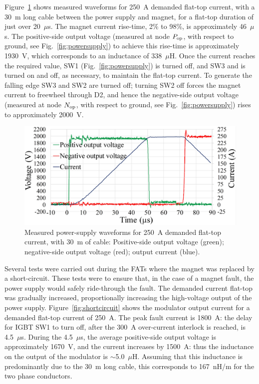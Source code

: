 \documentclass[aps,prab,twocolumn,superscriptaddress]{revtex4-1}
\begin{document}
Figure~\ref{fig:normaloperation} shows measured waveforms for 250~A demanded flat-top current, with a 30~m long cable between the power supply and magnet, for a flat-top duration of just over 20~$\mu$s. The magnet current rise-time, 2\% to 98\%, is approximately 46~$\mu$s. The positive-side output voltage (measured at node ${P_{\rm{op}}}$, with respect to ground, see Fig.~\ref{fig:powersupply}) to achieve this rise-time is approximately 1930~V, which corresponds to an inductance of 338~$\mu$H. Once the current reaches the required value, SW1 (Fig.~\ref{fig:powersupply}) is turned off, and SW3 and  is turned on and off, as necessary, to maintain the flat-top current. To generate the falling edge SW3 and SW2 are turned off; turning SW2 off forces the magnet current to freewheel through D2, and hence the negative-side output voltage (measured at node ${N_{\rm{op}}}$, with respect to ground, see Fig.~\ref{fig:powersupply}) rises to approximately 2000~V.

\begin{figure}[h]
	\includegraphics[width=\linewidth]{normal_operation-smaller.png} %
	\caption{Measured power-supply waveforms for 250~A demanded flat-top current, with 30~m of cable: Positive-side output voltage (green); negative-side output voltage (red); output current (blue).}
	\label{fig:normaloperation}
\end{figure}

Several tests were carried out during the FATs where the magnet was replaced by a short-circuit.  These tests were to ensure that, in the case of a magnet fault, the power supply would safely ride-through the fault. The demanded current flat-top was gradually increased, proportionally increasing the high-voltage output of the power supply. Figure~\ref{fig:shortcircuit} shows the modulator output current for a demanded flat-top current of 250~A. The peak fault current is 1800~A: the delay for IGBT SW1 to turn off, after the 300~A over-current interlock is reached, is 4.5~$\mu$s. During the 4.5~$\mu$s, the average positive-side output voltage is approximately 1670~V, and the current increases by 1500~A: thus the inductance on the output of the modulator is $\sim$5.0~$\mu$H. Assuming that this inductance is predominantly due to the 30~m long cable, this corresponds to 167~nH/m for the two phase conductors.
\end{document}
